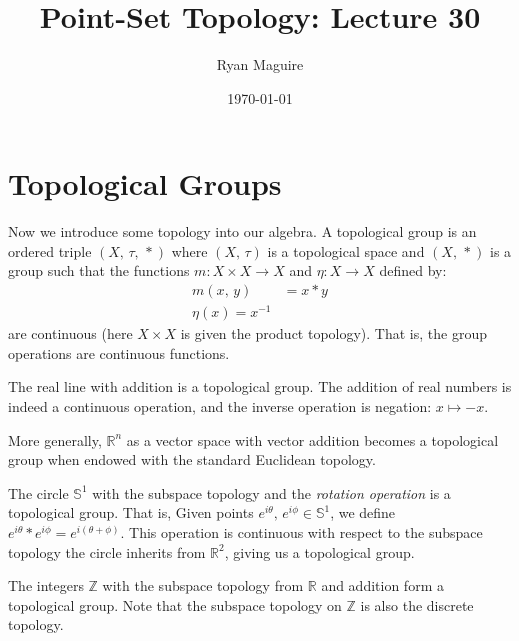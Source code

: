 \documentclass{article}
\title{Point-Set Topology: Lecture 30}
\author{Ryan Maguire}
\date{\today}
\theoremstyle{plain}
\theoremstyle{normal}
\newenvironment{example}{%
    \pushQED{\qed}\renewcommand{\qedsymbol}{$\blacksquare$}\examplex%
}{%
    \popQED\endexamplex%
}
\newenvironment{definition}{%
    \pushQED{\qed}\renewcommand{\qedsymbol}{$\blacksquare$}\definitionx%
}{%
    \popQED\enddefinitionx%
}
\begin{document}
    \maketitle
    \section{Topological Groups}
        Now we introduce some topology into our algebra.
        \begin{definition}[\textbf{Topological Group}]
            A topological group is an ordered triple $(X,\,\tau,\,*)$ where
            $(X,\,\tau)$ is a topological space and $(X,\,*)$ is a group
            such that the functions $m:X\times{X}\rightarrow{X}$ and
            $\eta:X\rightarrow{X}$ defined by:
            \begin{align}
                m(x,\,y)&=x*y\\
                \eta(x)=x^{-1}
            \end{align}
            are continuous (here $X\times{X}$ is given the product topology).
            That is, the group operations are continuous functions.
        \end{definition}
        \begin{example}
            The real line with addition is a topological group. The addition
            of real numbers is indeed a continuous operation, and the inverse
            operation is negation: $x\mapsto{-x}$.
        \end{example}
        \begin{example}
            More generally, $\mathbb{R}^{n}$ as a vector space with vector
            addition becomes a topological group when endowed with the standard
            Euclidean topology.
        \end{example}
        \begin{example}
            The circle $\mathbb{S}^{1}$ with the subspace topology and the
            \textit{rotation operation} is a topological group. That is,
            Given points $e^{i\theta},\,e^{i\phi}\in\mathbb{S}^{1}$, we define
            $e^{i\theta}*e^{i\phi}=e^{i(\theta+\phi)}$. This operation is
            continuous with respect to the subspace topology the circle
            inherits from $\mathbb{R}^{2}$, giving us a topological group.
        \end{example}
        \begin{example}
            The integers $\mathbb{Z}$ with the subspace topology from
            $\mathbb{R}$ and addition form a topological group. Note that the
            subspace topology on $\mathbb{Z}$ is also the discrete topology.
        \end{example}
\end{document}
